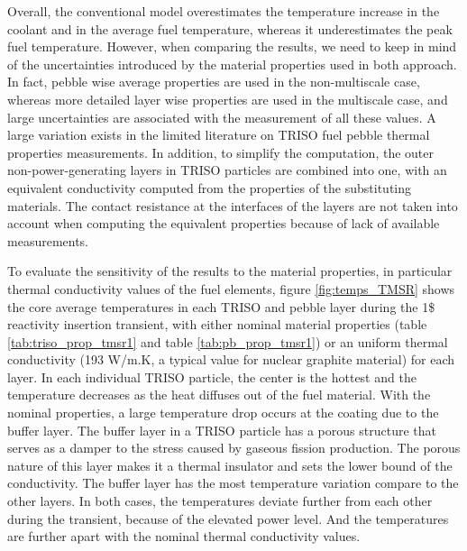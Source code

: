 \documentclass{elsarticle}
\begin{document}
Overall, the conventional model overestimates the temperature increase in the coolant and in the average fuel temperature, whereas it underestimates the peak fuel temperature. However, when comparing the results, we need to keep in mind of the uncertainties introduced by the material properties used in both approach. In fact, pebble wise average properties are used in the non-multiscale case, whereas more detailed layer wise properties are used in the multiscale case, and large uncertainties are associated with the measurement of all these values. A large variation exists in the limited literature on TRISO fuel pebble thermal properties measurements. In addition, to simplify the computation, the outer non-power-generating layers in TRISO particles are combined into one, with an equivalent conductivity computed from the properties of the substituting materials. 
The contact resistance at the interfaces of the layers are not taken into account when computing the equivalent properties because of lack of available measurements. 

To evaluate the sensitivity of the results to the material properties, in particular thermal conductivity values of the fuel elements, figure \ref{fig:temps_TMSR} shows the core average temperatures in each TRISO and pebble layer during the 1\$ reactivity insertion transient, with either nominal material properties (table \ref{tab:triso_prop_tmsr1} and table \ref{tab:pb_prop_tmsr1}) or an uniform thermal conductivity (193 W/m.K, a typical value for nuclear graphite material) for each layer. 
In each individual TRISO particle, the center is the hottest and the temperature decreases as the heat diffuses out of the fuel material. With the nominal properties, a large temperature drop occurs at the coating due to the buffer layer. The buffer layer in a TRISO particle has a porous structure that serves as a damper to the stress caused by gaseous fission production. The porous nature of this layer makes it a thermal insulator and sets the lower bound of the conductivity. The buffer layer has the most temperature variation compare to the other layers.
In both cases, the temperatures deviate further from each other during the transient, because of the elevated power level. And the temperatures are further apart with the nominal thermal conductivity values.   
\end{document}
